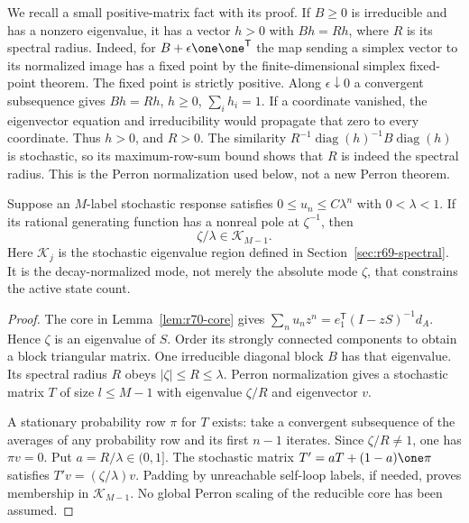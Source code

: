 We recall a small positive-matrix fact with its proof. If $B\ge0$ is irreducible and has a nonzero eigenvalue, it has a vector $h>0$ with $Bh=Rh$, where $R$ is its spectral radius. Indeed, for $B+\epsilon\one\one^{\mathsf T}$ the map sending a simplex vector to its normalized image has a fixed point by the finite-dimensional simplex fixed-point theorem. The fixed point is strictly positive. Along $\epsilon\downarrow0$ a convergent subsequence gives $Bh=Rh$, $h\ge0$, $\sum_i h_i=1$. If a coordinate vanished, the eigenvector equation and irreducibility would propagate that zero to every coordinate. Thus $h>0$, and $R>0$. The similarity $R^{-1}\operatorname{diag}(h)^{-1}B\operatorname{diag}(h)$ is stochastic, so its maximum-row-sum bound shows that $R$ is indeed the spectral radius. This is the Perron normalization used below, not a new Perron theorem.

\begin{proposition}\label{prop:r70-relative-spectrum}
Suppose an $M$-label stochastic response satisfies $0\le u_n\le C\lambda^n$ with $0<\lambda<1$. If its rational generating function has a nonreal pole at $\zeta^{-1}$, then
\begin{equation}\label{eq:r70-relative-spectrum}
 \zeta/\lambda\in\mathcal K_{M-1}.
\end{equation}
Here $\mathcal K_j$ is the stochastic eigenvalue region defined in Section~\ref{sec:r69-spectral}. It is the decay-normalized mode, not merely the absolute mode $\zeta$, that constrains the active state count.
\end{proposition}
\begin{proof}
The core in Lemma~\ref{lem:r70-core} gives
$\sum_nu_nz^n=e_1^{\mathsf T}(I-zS)^{-1}d_A$. Hence $\zeta$ is an eigenvalue of $S$. Order its strongly connected components to obtain a block triangular matrix. One irreducible diagonal block $B$ has that eigenvalue. Its spectral radius $R$ obeys $|\zeta|\le R\le\lambda$. Perron normalization gives a stochastic matrix $T$ of size $l\le M-1$ with eigenvalue $\zeta/R$ and eigenvector $v$.

A stationary probability row $\pi$ for $T$ exists: take a convergent subsequence of the averages of any probability row and its first $n-1$ iterates. Since $\zeta/R\ne1$, one has $\pi v=0$. Put $a=R/\lambda\in(0,1]$. The stochastic matrix
$T'=aT+(1-a)\one\pi$ satisfies $T'v=(\zeta/\lambda)v$. Padding by unreachable self-loop labels, if needed, proves membership in $\mathcal K_{M-1}$. No global Perron scaling of the reducible core has been assumed.
\end{proof}

